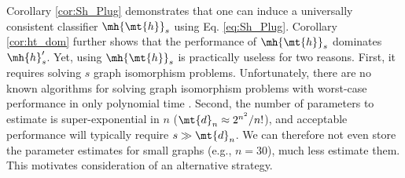 \documentclass[10pt,journal,cspaper,compsoc]{IEEEtran}
\begin{document}
Corollary \ref{cor:Sh_Plug} demonstrates that one can induce a universally consistent classifier $\mh{\mt{h}}_s$  using Eq. \eqref{eq:Sh_Plug}. Corollary \ref{cor:ht_dom} further shows that the performance of $\mh{\mt{h}}_s$ dominates $\mh{h}_s'$.  Yet, using $\mh{\mt{h}}_s$ is practically useless for two reasons.  First, it requires solving $s$ graph isomorphism problems. Unfortunately, there are no known algorithms for solving graph isomorphism problems with worst-case performance in only polynomial time \cite{Fortin1996}. Second, the number of parameters to estimate is super-exponential in $n$ ($\mt{d}_n \approx 2^{n^2}/n!$), and acceptable performance will typically require $s \gg \mt{d}_n$.  We can therefore not even store the parameter estimates for small graphs (e.g., $n=30$), much less estimate them.  
This motivates consideration of an alternative strategy.
\end{document}
